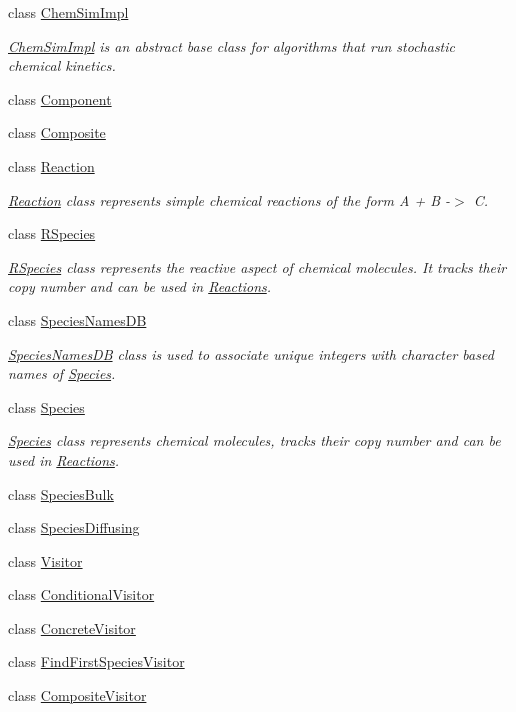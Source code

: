 \begin{DoxyCompactItemize}
class \hyperlink{classchem_1_1ChemSimImpl}{Chem\-Sim\-Impl}
\begin{DoxyCompactList}\small\item\em \hyperlink{classchem_1_1ChemSimImpl}{Chem\-Sim\-Impl} is an abstract base class for algorithms that run stochastic chemical kinetics. \end{DoxyCompactList}\item 
class \hyperlink{classchem_1_1Component}{Component}
\item 
class \hyperlink{classchem_1_1Composite}{Composite}
\item 
class \hyperlink{classchem_1_1Reaction}{Reaction}
\begin{DoxyCompactList}\small\item\em \hyperlink{classchem_1_1Reaction}{Reaction} class represents simple chemical reactions of the form A + B -\/$>$ C. \end{DoxyCompactList}\item 
class \hyperlink{classchem_1_1RSpecies}{R\-Species}
\begin{DoxyCompactList}\small\item\em \hyperlink{classchem_1_1RSpecies}{R\-Species} class represents the reactive aspect of chemical molecules. It tracks their copy number and can be used in \hyperlink{classchem_1_1Reaction}{Reactions}. \end{DoxyCompactList}\item 
class \hyperlink{classchem_1_1SpeciesNamesDB}{Species\-Names\-D\-B}
\begin{DoxyCompactList}\small\item\em \hyperlink{classchem_1_1SpeciesNamesDB}{Species\-Names\-D\-B} class is used to associate unique integers with character based names of \hyperlink{classchem_1_1Species}{Species}. \end{DoxyCompactList}\item 
class \hyperlink{classchem_1_1Species}{Species}
\begin{DoxyCompactList}\small\item\em \hyperlink{classchem_1_1Species}{Species} class represents chemical molecules, tracks their copy number and can be used in \hyperlink{classchem_1_1Reaction}{Reactions}. \end{DoxyCompactList}\item 
class \hyperlink{classchem_1_1SpeciesBulk}{Species\-Bulk}
\item 
class \hyperlink{classchem_1_1SpeciesDiffusing}{Species\-Diffusing}
\item 
class \hyperlink{classchem_1_1Visitor}{Visitor}
\item 
class \hyperlink{classchem_1_1ConditionalVisitor}{Conditional\-Visitor}
\item 
class \hyperlink{classchem_1_1ConcreteVisitor}{Concrete\-Visitor}
\item 
class \hyperlink{classchem_1_1FindFirstSpeciesVisitor}{Find\-First\-Species\-Visitor}
\item 
class \hyperlink{classchem_1_1CompositeVisitor}{Composite\-Visitor}
\end{DoxyCompactItemize}
